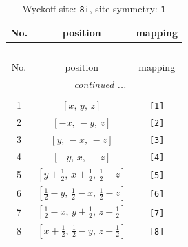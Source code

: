 \documentclass[fleqn,8pt]{jsarticle}
\begin{document}
\renewcommand{\arraystretch}{1.2}
\begin{longtable}{ccc}
\caption{Wyckoff site: {\tt 8i}, site symmetry: {\tt 1}}
 \\
 \hline \hline
No. & position & mapping \\ \hline \endfirsthead

\multicolumn{2}{l}{\tablename\ \thetable{}} \\
 \hline \hline
No. & position & mapping \\ \hline \endhead

 \hline \hline
\multicolumn{2}{r}{\footnotesize\it continued ...} \\ \endfoot

 \hline \hline
\multicolumn{2}{r}{} \\ \endlastfoot

1 & $\left[ x,\, y,\, z \right]$ & {\tt [1]} \\ \hline
2 & $\left[ - x,\, - y,\, z \right]$ & {\tt [2]} \\ \hline
3 & $\left[ y,\, - x,\, - z \right]$ & {\tt [3]} \\ \hline
4 & $\left[ - y,\, x,\, - z \right]$ & {\tt [4]} \\ \hline
5 & $\left[ y + \frac{1}{2},\, x + \frac{1}{2},\, \frac{1}{2} - z \right]$ & {\tt [5]} \\ \hline
6 & $\left[ \frac{1}{2} - y,\, \frac{1}{2} - x,\, \frac{1}{2} - z \right]$ & {\tt [6]} \\ \hline
7 & $\left[ \frac{1}{2} - x,\, y + \frac{1}{2},\, z + \frac{1}{2} \right]$ & {\tt [7]} \\ \hline
8 & $\left[ x + \frac{1}{2},\, \frac{1}{2} - y,\, z + \frac{1}{2} \right]$ & {\tt [8]} \\
\end{longtable}
\end{document}
